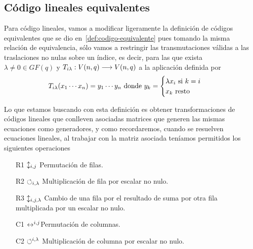 \subsection{Código lineales equivalentes}
Para código lineales, vamos a modificar ligeramente la definición de códigos equivalentes que se dio en~\eqref{def:codigo-equivalente} pues tomando la misma relación de equivalencia, sólo vamos a restringir las transmutaciones válidas a las traslaciones no nulas sobre un índice, es decir, para las que exista $\lambda\neq 0\in GF(q)$ y $T_{i\lambda}:V(n, q)\longrightarrow V(n, q)$ a la aplicación definida por
\[
	T_{i\lambda}(x_1\cdots x_{n})=y_1\cdots y_n \text{ donde } y_k = \begin{cases}
		                                                            \lambda x_i \text{ si } k = i \\
		                                                            x_k \text{ resto}
	\end{cases}
\]

Lo que estamos buscando con esta definición es obtener transformaciones de códigos lineales que conlleven asociadas matrices que generen las mismas ecuaciones como generadores, y como recordaremos, cuando se resuelven ecuaciones lineales, al trabajar con la matriz asociada teníamos permitidos los siguientes operaciones
\begin{itemize}
	\item[R1] $\updownarrow_{i, j}$ Permutación de filas.
	\item[R2] $\circlearrowleft_{i, \lambda}$ Multiplicación de fila por escalar no nulo.
	\item[R3] $\updownarrow_{i, j, \lambda}$ Cambio de una fila por el resultado de suma por otra fila multiplicada por un escalar no nulo.
	\item[C1] $\leftrightarrow^{i, j}$Permutación de columnas.
	\item[C2] $\circlearrowleft^{i, \lambda}$ Multiplicación de columna por escalar no nulo.
\end{itemize}


